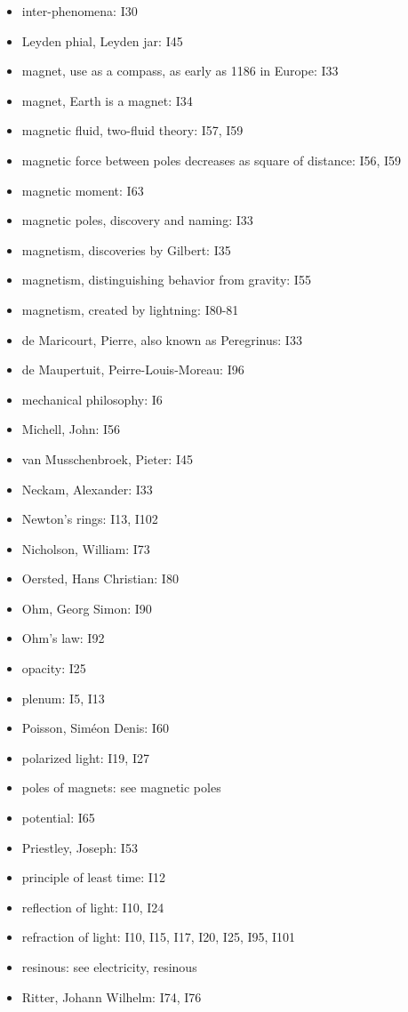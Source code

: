 \documentclass[a4paper]{article}
\theoremstyle{plain}
\theoremstyle{definition}
\begin{document}
\begin{itemize}
\item inter-phenomena: I30
\item Leyden phial, Leyden jar: I45
\item magnet, use as a compass, as early as 1186 in Europe: I33
\item magnet, Earth is a magnet: I34
\item magnetic fluid, two-fluid theory: I57, I59
\item magnetic force between poles decreases as square of distance: I56, I59
\item magnetic moment: I63
\item magnetic poles, discovery and naming: I33
\item magnetism, discoveries by Gilbert: I35
\item magnetism, distinguishing behavior from gravity: I55
\item magnetism, created by lightning: I80-81
\item de Maricourt, Pierre, also known as Peregrinus: I33
\item de Maupertuit, Peirre-Louis-Moreau: I96
\item mechanical philosophy: I6
\item Michell, John: I56
\item van Musschenbroek, Pieter: I45
\item Neckam, Alexander: I33
\item Newton's rings: I13, I102
\item Nicholson, William: I73
\item Oersted, Hans Christian: I80
\item Ohm, Georg Simon: I90
\item Ohm's law: I92
\item opacity: I25
\item plenum: I5, I13
\item Poisson, Sim\'{e}on Denis: I60
\item polarized light: I19, I27
\item poles of magnets: see magnetic poles
\item potential: I65
\item Priestley, Joseph: I53
\item principle of least time: I12
\item reflection of light: I10, I24
\item refraction of light: I10, I15, I17, I20, I25, I95, I101
\item resinous: see electricity, resinous
\item Ritter, Johann Wilhelm: I74, I76

\end{itemize}
\end{document}
